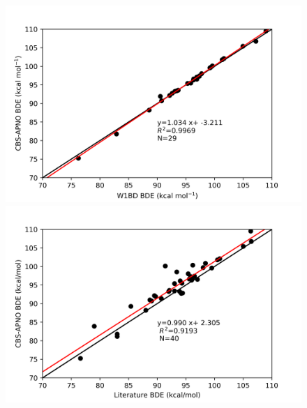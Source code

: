 \begin{figure}
\hspace*{-1.5cm}
\begin{minipage}{8cm}
  \centering
  \includegraphics[width=\textwidth]{figures/w1bd-cbsapno}
\end{minipage}%
\begin{minipage}{8cm}
  \centering
  \includegraphics[width=\textwidth]{figures/lit-cbsapno}
\end{minipage}
\end{figure}

